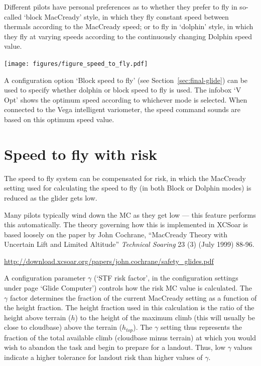 Different pilots have personal preferences as to whether they prefer
to fly in so-called `block MacCready' style, in which they fly
constant speed between thermals according to the MacCready speed; or
to fly in `dolphin' style, in which they fly at varying speeds
according to the continuously changing Dolphin speed value.

\begin{maxipage}
\begin{center}
\texttt{[image: figures/figure\_speed\_to\_fly.pdf]}
\end{center}
\end{maxipage}

A configuration option `Block speed to fly' (see
Section~\ref{sec:final-glide}) can be used to specify whether dolphin
or block speed to fly is used.  The infobox `V Opt' shows the optimum
speed according to whichever mode is selected.  When connected to the
Vega intelligent variometer, the speed command sounds are based on
this optimum speed value.


\section{Speed to fly with risk}\label{sec:safety-factor}

  The speed to fly system can be compensated for risk, in which the
  MacCready setting used for calculating the speed to fly (in both
  Block or Dolphin modes) is reduced as the glider gets low.

  Many pilots typically wind down the MC as they get low --- this
  feature performs this automatically.  The theory governing how this
  is implemented in XCSoar is based loosely on the paper by John
  Cochrane, ``MacCready Theory with Uncertain Lift and Limited
  Altitude'' {\em Technical Soaring} 23 (3) (July 1999) 88-96.

\url{http://download.xcsoar.org/papers/john.cochrane/safety_glides.pdf}

  A configuration parameter $\gamma$ (`STF risk factor', in the
  configuration settings under page `Glide Computer') controls how the
  risk MC value is calculated.  The $\gamma$ factor determines the
  fraction of the current MacCready setting as a function of the
  height fraction.  The height fraction used in this calculation is
  the ratio of the height above terrain ($h$) to the height of the
  maximum climb (this will usually be close to cloudbase) above the
  terrain ($h_{top}$).  The $\gamma$ setting thus represents the
  fraction of the total available climb (cloudbase minus terrain) at
  which you would wish to abandon the task and begin to prepare for a
  landout.  Thus, low $\gamma$ values indicate a higher tolerance for
  landout risk than higher values of $\gamma$.

